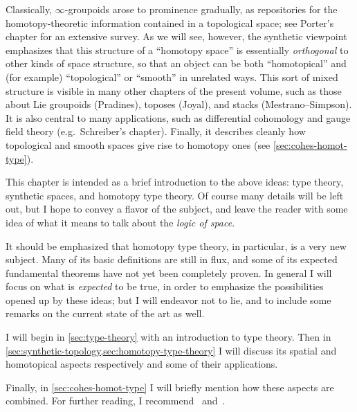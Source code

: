 \documentclass[12pt]{article}
\def\oo{\ensuremath{\infty}}
\numberwithin{equation}{section}
\begin{document}
Classically, \oo-groupoids arose to prominence gradually, as repositories for the homotopy-theoretic information contained in a topological space; see Porter's chapter for an extensive survey.
As we will see, however, the synthetic viewpoint emphasizes that this structure of a ``homotopy space'' is essentially \emph{orthogonal} to other kinds of space structure, so that an object can be both ``homotopical'' and (for example) ``topological'' or ``smooth'' in unrelated ways.
This sort of mixed structure is visible in many other chapters of the present volume, such as those about Lie groupoids (Pradines), toposes (Joyal), and stacks (Mestrano--Simpson).
It is also central to many applications, such as differential cohomology and gauge field theory (e.g.\ Schreiber's chapter).
Finally, it describes cleanly how topological and smooth spaces give rise to homotopy ones (see \cref{sec:cohes-homot-type}).

This chapter is intended as a brief introduction to the above ideas: type theory, synthetic spaces, and homotopy type theory.
Of course many details will be left out, but I hope to convey a flavor of the subject, and leave the reader with some idea of what it means to talk about the \emph{logic of space}.

It should be emphasized that homotopy type theory, in particular, is a very new subject.
Many of its basic definitions are still in flux, and some of its expected fundamental theorems have not yet been completely proven.
In general I will focus on what is \emph{expected} to be true, %
in order to emphasize the possibilities opened up by these ideas; but I will endeavor not to lie, and to include some remarks on the current state of the art as well.

I will begin in \cref{sec:type-theory} with an introduction to type theory.
Then in \cref{sec:synthetic-topology,sec:homotopy-type-theory} I will discuss its spatial and homotopical aspects respectively and some of their applications.

Finally, in \cref{sec:cohes-homot-type} I will briefly mention how these aspects are combined. %
For further reading, I recommend~\cite{awodey:tt-and-htpy,apw:vvu-hott,pw:hottvvuf,shulman:synhott} and~\cite{hottbook}.
\end{document}
